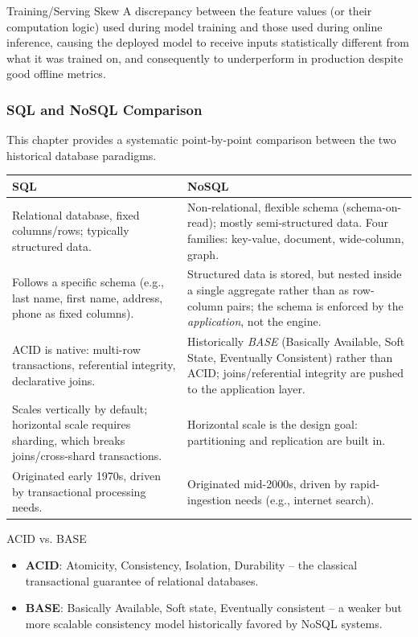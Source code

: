 \begin{defbox}{Training/Serving Skew}
A discrepancy between the feature values (or their computation logic) used during model training and those used during online inference, causing the deployed model to receive inputs statistically different from what it was trained on, and consequently to underperform in production despite good offline metrics.
\end{defbox}

\subsubsection{SQL and NoSQL Comparison}

This chapter provides a systematic point-by-point comparison between the two historical database paradigms.

\begin{center}
\begin{tabular}{p{5.7cm}p{7.3cm}}
\toprule
\textbf{SQL} & \textbf{NoSQL} \\
\midrule
Relational database, fixed columns/rows; typically structured data. & Non-relational, flexible schema (schema-on-read); mostly semi-structured data. Four families: key-value, document, wide-column, graph. \\[0.15cm]
Follows a specific schema (e.g., last name, first name, address, phone as fixed columns). & Structured data is stored, but nested inside a single aggregate rather than as row-column pairs; the schema is enforced by the \emph{application}, not the engine. \\[0.15cm]
ACID is native: multi-row transactions, referential integrity, declarative joins. & Historically \emph{BASE} (Basically Available, Soft State, Eventually Consistent) rather than ACID; joins/referential integrity are pushed to the application layer. \\[0.15cm]
Scales vertically by default; horizontal scale requires sharding, which breaks joins/cross-shard transactions. & Horizontal scale is the design goal: partitioning and replication are built in. \\[0.15cm]
Originated early 1970s, driven by transactional processing needs. & Originated mid-2000s, driven by rapid-ingestion needs (e.g., internet search). \\
\bottomrule
\end{tabular}
\end{center}

\begin{defbox}{ACID vs. BASE}
\begin{itemize}
    \item \textbf{ACID}: Atomicity, Consistency, Isolation, Durability -- the classical transactional guarantee of relational databases.
    \item \textbf{BASE}: Basically Available, Soft state, Eventually consistent -- a weaker but more scalable consistency model historically favored by NoSQL systems.
\end{itemize}
\end{defbox}

